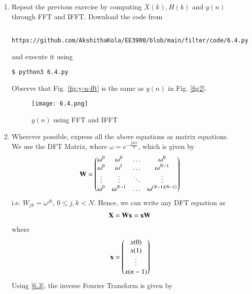 \documentclass[journal,12pt,twocolumn]{IEEEtran}
\renewcommand\thesection{\arabic{section}}
\begin{document}
\begin{enumerate}[label=\thesection.\arabic*
,ref=\thesection.\theenumi]
\begin{lstlisting}
\end{lstlisting}
\begin{figure}[!ht]
\centering
\texttt{[image: 6.3.png]}
\caption{$y(n)$ from the DFT}
\label{fig:yndft}
\end{figure}
\item Repeat the previous exercise by computing $X(k), H(k)$ and $y(n)$ through FFT and 
 IFFT.
 \solution Download the code from
\begin{lstlisting}
	https://github.com/AkshithaKola/EE3900/blob/main/filter/code/6.4.py
\end{lstlisting}
and execute it using
\begin{lstlisting}
$ python3 6.4.py
\end{lstlisting}
Observe that Fig. \eqref{fig:y-n-fft} is the same as $y(n)$ in Fig. \eqref{fig2}.
\begin{figure}
\centering
\texttt{[image: 6.4.png]}
\caption{$y(n)$ using FFT and IFFT}
\label{fig:y-n-fft}
\end{figure}
\item Wherever possible, express all the above equations as matrix equations.\\
\solution
We use the DFT Matrix, where $\omega = e^{-\frac{j2k\pi}{N}}$, which is given by
\begin{align}
	\mathbf{W} = 
	\begin{pmatrix}
		\omega^0 & \omega^0 & \ldots & \omega^0 \\
		\omega^0 & \omega^1 & \ldots & \omega^{N - 1} \\
		\vdots & \vdots & \ddots & \vdots \\
		\omega^0 & \omega^{N - 1} & \ldots & \omega^{(N -1)(N - 1)}
	\end{pmatrix}
\end{align}
i.e. $W_{jk} = \omega^{jk}$, $0 \leq j, k < N$. Hence, we can write any DFT equation as
\begin{align}
	\mathbf{X} = \mathbf{W}\mathbf{x} = \mathbf{x}\mathbf{W}
\end{align}
\noindent where
\begin{align}
	\mathbf{x} = 
	\begin{pmatrix}
		x(0) \\ x(1) \\ \vdots \\ x(n - 1)
	\end{pmatrix}
\end{align}
\noindent Using \eqref{6.3}, the inverse Fourier Transform is given by
\begin{align}

\end{align}
\end{enumerate}
\end{document}
